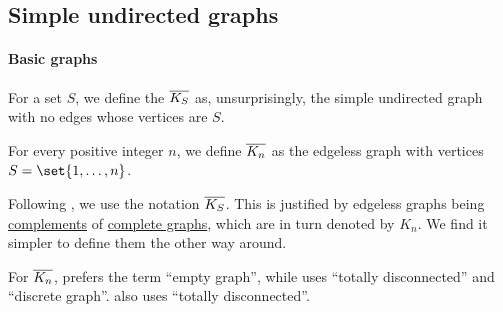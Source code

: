 \subsection{Simple undirected graphs}\label{subsec:simple_undirected_graphs}

\paragraph{Basic graphs}

\begin{definition}\label{def:edgeless_graph}\mimprovised
  For a set \( S \), we define the  \( \oline{K_S} \) as, unsurprisingly, the simple undirected graph with no edges whose vertices are \( S \).

  For every positive integer \( n \), we define \( \oline{K_n} \) as the edgeless graph with vertices \( S = \set{ 1, \ldots, n } \).
\end{definition}
\begin{comments}
  \item Following , we use the notation \( \oline{K_S} \). This is justified by edgeless graphs being \hyperref[def:graph_complement]{complements} of \hyperref[def:complete_graph]{complete graphs}, which are in turn denoted by \( K_n \). We find it simpler to define them the other way around.

  \item For \( \oline{K_n} \),  prefers the term \enquote{empty graph}, while  uses \enquote{totally disconnected} and \enquote{discrete graph}.  also uses \enquote{totally disconnected}.
\end{comments}

